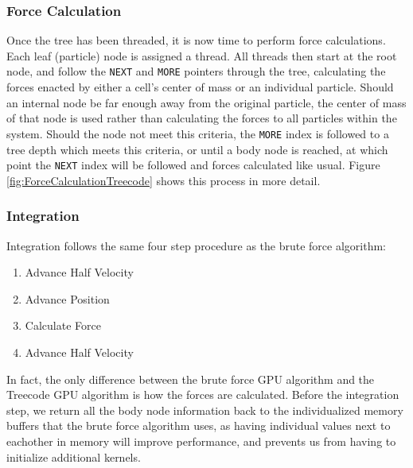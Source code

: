 \documentclass{thesis}
\begin{document}
\subsubsection{Force Calculation}
Once the tree has been threaded, it is now time to perform force calculations. Each leaf (particle) node is assigned a thread. All threads then start at the root node, and follow the \texttt{NEXT} and \texttt{MORE} pointers through the tree, calculating the forces enacted by either a cell's center of mass or an individual particle. Should an internal node be far enough away from the original particle, the center of mass of that node is used rather than calculating the forces to all particles within the system. Should the node not meet this criteria, the \texttt{MORE} index is followed to a tree depth which meets this criteria, or until a body node is reached, at which point the \texttt{NEXT} index will be followed and forces calculated like usual. Figure \ref{fig:ForceCalculationTreecode} shows this process in more detail.
\subsubsection{Integration}
Integration follows the same four step procedure as the brute force algorithm:
\begin{enumerate}[noitemsep]
    \item Advance Half Velocity
    \item Advance Position
    \item Calculate Force
    \item Advance Half Velocity
\end{enumerate}
In fact, the only difference between the brute force GPU algorithm and the Treecode GPU algorithm is how the forces are calculated. Before the integration step, we return all the body node information back to the individualized memory buffers that the brute force algorithm uses, as having individual values next to eachother in memory will improve performance, and prevents us from having to initialize additional kernels.
\end{document}
